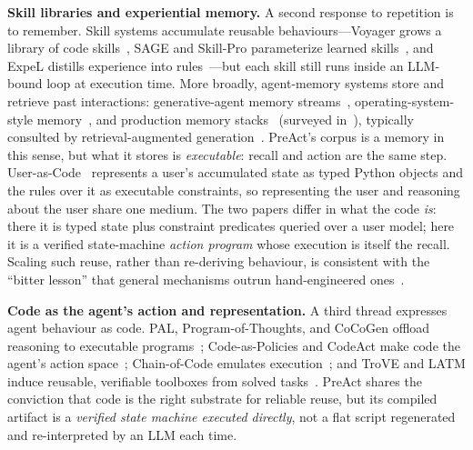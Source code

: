 \documentclass[11pt]{article}
\begin{document}
\textbf{Skill libraries and experiential memory.} A second response to repetition is to remember. Skill systems accumulate reusable behaviours---Voyager grows a library of code skills~\cite{wang2024voyager}, SAGE and Skill-Pro parameterize learned skills~\cite{liang2024sage,mi2026skillpro}, and ExpeL distills experience into rules~\cite{zhao2024expel}---but each skill still runs inside an LLM-bound loop at execution time. More broadly, agent-memory systems store and retrieve past interactions: generative-agent memory streams~\cite{park2023generative}, operating-system-style memory~\cite{packer2023memgpt}, and production memory stacks~\cite{chhikara2025mem0,xu2025amem} (surveyed in~\cite{zhang2024memorysurvey}), typically consulted by retrieval-augmented generation~\cite{lewis2020rag}. PreAct's corpus is a memory in this sense, but what it stores is \emph{executable}: recall and action are the same step. User-as-Code~\cite{li2026userascode} represents a user's accumulated state as typed Python objects and the rules over it as executable constraints, so representing the user and reasoning about the user share one medium. The two papers differ in what the code \emph{is}: there it is typed state plus constraint predicates queried over a user model; here it is a verified state-machine \emph{action program} whose execution is itself the recall. Scaling such reuse, rather than re-deriving behaviour, is consistent with the ``bitter lesson'' that general mechanisms outrun hand-engineered ones~\cite{sutton2019bitter}.

\textbf{Code as the agent's action and representation.} A third thread expresses agent behaviour as code. PAL, Program-of-Thoughts, and CoCoGen offload reasoning to executable programs~\cite{gao2023pal,chen2023pot,madaan2022cocogen}; Code-as-Policies and CodeAct make code the agent's action space~\cite{liang2023codeaspolicies,wang2024codeact}; Chain-of-Code emulates execution~\cite{li2024chainofcode}; and TroVE and LATM induce reusable, verifiable toolboxes from solved tasks~\cite{wang2024trove,cai2023latm}. PreAct shares the conviction that code is the right substrate for reliable reuse, but its compiled artifact is a \emph{verified state machine executed directly}, not a flat script regenerated and re-interpreted by an LLM each time.
\end{document}
